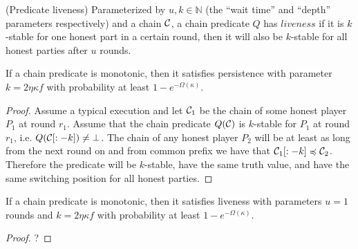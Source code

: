 \begin{definition}{(Predicate liveness)}
    Parameterized by $u, k \in \mathbb{N}$ (the ``wait time'' and ``depth''
    parameters respectively) and a chain $\mathcal{C}$, a chain predicate
    $Q$ has $\textit{liveness}$ if it is $k$-stable for one honest part
    in a certain round, then it will also be $k$-stable for all honest parties
    after $u$ rounds.
\end{definition}

\begin{theorem}
    If a chain predicate is monotonic, then it satisfies persistence with
    parameter $k = 2\eta \kappa f$ with probability at least $1 -
    e^{-\Omega(\kappa)}$.
\end{theorem}

\begin{proof}
    Assume a typical execution and let $\mathcal{C}_1$ be the chain of some honest
    player $P_1$ at round $r_1$. Assume that the chain predicate $Q(\mathcal{C})$ is
    $k$-stable for $P_1$ at round $r_1$, i.e.  $Q(\mathcal{C}[:-k]) \neq \bot$.
    The chain of any honest player $P_2$ will be at least as long from the next
    round on and from common prefix we have that $\mathcal{C}_1[:-k]
    \preccurlyeq \mathcal{C}_2$. Therefore the predicate will be $k$-stable, have
    the same truth value, and have the same switching position for all honest
    parties.
\end{proof}

\begin{theorem}
    If a chain predicate is monotonic, then it satisfies liveness with
    parameters $u = 1$ rounds and $k = 2\eta \kappa f$ with probability at
    least $1 - e^{-\Omega(\kappa)}$.
\end{theorem}

\begin{proof}
    ?
\end{proof}

